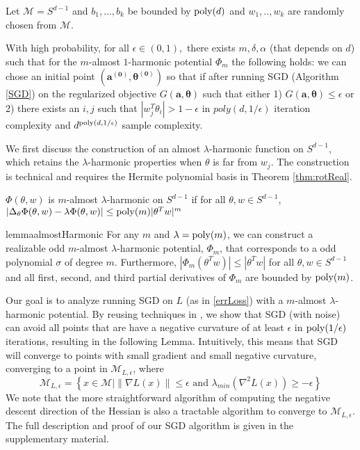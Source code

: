 \begin{theorem}\label{eigSGD}
  Let $\mathcal{M} = S^{d-1}$ and $b_1,...,b_k$ be bounded by $\mathrm{poly}(d)$ and $w_1,..,w_k$ are randomly chosen from $\mathcal{M}$.  

  With high probability, for all $\epsilon \in (0,1),$ there exists $m, \delta, \alpha$ (that depends on $d$) such that for the $m$-almost $1$-harmonic potential $\Phi_m$ the
  following holds: we can chose an initial point $(\boldsymbol{a^{(0)}, \theta^{(0)}})$ so that if after running SGD (Algorithm \ref{SGD}) on the regularized objective
  $G(\boldsymbol{a,\theta})$ such that either 1) $G(\boldsymbol{a,\theta}) \leq \epsilon$ or 2) there exists an $i, j$ such that $|w_j^T\theta_i| > 1- \epsilon$ in $poly(d,1/\epsilon)$ iteration complexity and $d^{\mathrm{poly}(d, 1/\epsilon)}$ sample complexity.
\end{theorem}
%
%
We first discuss the construction of an almost $\lambda$-harmonic function on $S^{d-1}$, which retains the $\lambda$-harmonic properties when $\theta$ is far from $w_j$. The construction is technical and requires the Hermite polynomial basis in Theorem \ref{thm:rotReal}.
%
%
\begin{definition}
$\Phi(\theta, w)$ is $m$-almost $\lambda$-harmonic on $S^{d-1}$ if for
all $\theta, w\in S^{d-1}$, $|\Delta_{\theta}\Phi(\theta, w) - \lambda \Phi (\theta,w)| \leq \mathrm{poly}(m)|\theta^Tw|^m$ 
\end{definition}
%
%
\begin{restatable}{lemma}{almostHarmonic}\label{AlmostHarmonic}
For any $m$ and $\lambda = \mathrm{poly}(m)$,  we can construct a realizable odd $m$-almost $\lambda$-harmonic potential, $\Phi_m$, that corresponds to a odd polynomial $\sigma$ of degree $m$. Furthermore, $|\Phi_m(\theta^Tw)|\leq |\theta^Tw|$ for all $\theta, w \in S^{d-1}$ and all first, second, and third partial derivatives of $\Phi_m$ are bounded by $\mathrm{poly}(m)$.
\end{restatable} 
%
%
%
Our goal is to analyze running SGD on $L$ (as in \eqref{errLoss}) with a $m$-almost $\lambda$-harmonic potential. By reusing techniques in \cite{GeHJY15}, we show that SGD (with noise) can avoid all points that are have a negative curvature of at least $\epsilon$ in $\mathrm{poly}(1/\epsilon)$ iterations, resulting in the following Lemma. Intuitively, this means that SGD will converge to points with small gradient and small negative curvature, converging to a point in $\mathcal{M}_{L, \epsilon}$, where 
%
\[\mathcal{M}_{L, \epsilon} = \left\{x\in \mathcal{M} \Big| \|\nabla L(x)\|
  \leq \epsilon \text{ and } \lambda_{min}(\nabla^2 L(x)) \geq
  -\epsilon\right\}\]
%
We note that the more straightforward algorithm of computing the negative descent direction of the Hessian is also a tractable algorithm to converge to $\mathcal{M}_{L,\epsilon}$. The full description and proof of our SGD algorithm is given in the supplementary material. 

